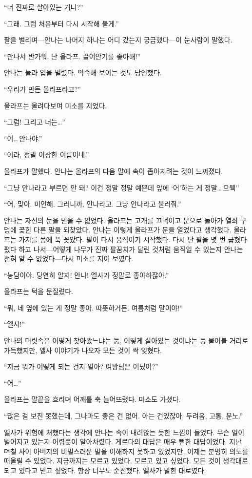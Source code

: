 ``너 진짜로 살아있는 거니?''

``그래. 그럼 처음부터 다시 시작해 볼게.''

팔을 벌리며—안나는 나머지 하나는 어디 갔는지 궁금했다—이 눈사람이 말했다.

``만나서 반가워. 난 올라프. 끌어안기를 좋아해!''

안나는 놀라 입을 벌렸다. 익숙해 보이는 것도 당연했다.

``우리가 만든 올라프라고?''

올라프는 올려다보며 미소를 지었다.

``그럼! 그리고 너는\ldots''

``어\ldots\,안나야.''

``어라, 정말 이상한 이름이네.''

올라프가 말했다. 안나는 올라프의 다음 말에 속이 좁아지려는 것이 느껴졌다.

``그냥 안나라고 부르면 안 돼? 이건 정말 정말 예쁜데 앞에 `어'하는 게 정말\ldots\,으웩''

``어, 맞아. 미안해. 그러니까, 안나라고. 그냥 안나라고 불러줘.''

안나는 자신의 눈을 믿을 수 없었다. 올라프는 고개를 끄덕이고 문으로 돌아가 열쇠 구멍에 꽂힌 다른 팔을 되찾았다. 안나는 이렇게 올라프가 문을 열었다고 생각했다. 올라프는 가지를 몸에 푹 꽂았다. 팔이 다시 움직이기 시작했다. 다시 단 팔을 몇 번 굽혔다 폈다 하고 나서—어떻게 나무가 진짜 팔꿈치가 달린 것처럼 움직일 수 있는지 안나는 전혀 알 수 없었다—다시 미소를 지어 보였다.

``농담이야. 당연히 알지! 안나! 엘사가 정말로 좋아하잖아.''

올라프는 턱을 문질렀다.

``뭐, 네 옆에 있는 게 정말 좋아. 따뜻하거든. 여름처럼 말이야!''

``엘사!''

안나의 머릿속은 어떻게 찾아왔느냐는 둥, 어떻게 살아있는 것이냐는 둥 물어볼 거리로 가득했지만, 엘사 이야기가 나오자 모든 것이 싹 잊혔다.

``지금 뭐가 어떻게 되는 건지 알아? 여왕님은 어딨어?''

``어\ldots''

올라프는 말끝을 흐리며 어깨를 축 늘어뜨렸다. 미소도 가셨다.

``많은 걸 보진 못했는데, 그나마도 좋은 건 없어. 아는 건 있잖아. 두려움, 고통, 분노.''

엘사가 위험에 처했다는 생각에 안나는 속이 내려앉는 듯한 느낌이 들었다. 무슨 일이 벌어지고 있는지 어렴풋이 알아차렸다. 게르다의 대답은 매우 뻔한 대답이었다. 지난 며칠 사이 아버지의 비밀스러운 말을 이해하지 못하고 있었지만, 이제는 분명히 의도를 떠올릴 수 있었다. 지금까지는 모르고 있었다. 모르고 있고 싶었다. 모든 것이 생각대로 되고 있다고 믿고 싶었다. 항상 너무도 순진했다. 엘사가 말한 대로였다.

